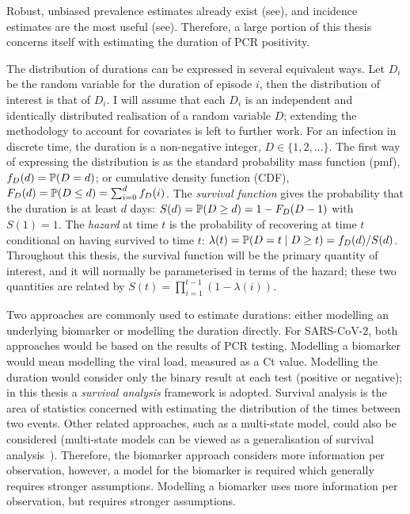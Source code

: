 \documentclass[thesis.tex]{subfiles}
\begin{document}
Robust, unbiased prevalence estimates already exist (see), and incidence estimates are the most useful (see).
Therefore, a large portion of this thesis concerns itself with estimating the duration of PCR positivity.

The distribution of durations can be expressed in several equivalent ways.
Let $D_i$ be the random variable for the duration of episode $i$, then the distribution of interest is that of $D_i$.
I will assume that each $D_i$ is an independent and identically distributed realisation of a random variable $D$; extending the methodology to account for covariates is left to further work.
For an infection in discrete time, the duration is a non-negative integer, \ie $D \in \{1, 2, \dots\}$.
The first way of expressing the distribution is as the standard probability mass function (pmf), $f_{D}(d) = \operatorname{\mathbb{P}}(D = d)$; or cumulative density function (CDF), $F_{D}(d) = \operatorname{\mathbb{P}}(D \leq d) = \sum_{i=0}^d f_{D}(i)$.
The \emph{survival function} gives the probability that the duration is at least $d$ days: $S(d) = \operatorname{\mathbb{P}}(D \geq d) = 1 - F_{D}(D - 1)$ with $S(1) = 1$.
The \emph{hazard} at time $t$ is the probability of recovering at time $t$ conditional on having survived to time $t$: $\lambda(t) = \operatorname{\mathbb{P}}(D = t \mid D \geq t) = f_{D}(d) / S(d)$.
Throughout this thesis, the survival function will be the primary quantity of interest, and it will normally be parameterised in terms of the hazard; these two quantities are related by $S(t) = \prod_{i=1}^{t-1} (1 - \lambda(i))$.

Two approaches are commonly used to estimate durations: either modelling an underlying biomarker or modelling the duration directly.
For SARS-CoV-2, both approaches would be based on the results of PCR testing.
Modelling a biomarker would mean modelling the viral load, measured as a Ct value.
Modelling the duration would consider only the binary result at each test (positive or negative); in this thesis a \emph{survival analysis} framework is adopted.
Survival analysis is the area of statistics concerned with estimating the distribution of the times between two events.
Other related approaches, such as a multi-state model, could also be considered (multi-state models can be viewed as a generalisation of survival analysis~\autocite{jacksonMSM}).
Therefore, the biomarker approach considers more information per observation, however, a model for the biomarker is required which generally requires stronger assumptions.
Modelling a biomarker uses more information per observation, but requires stronger assumptions.

\end{document}
